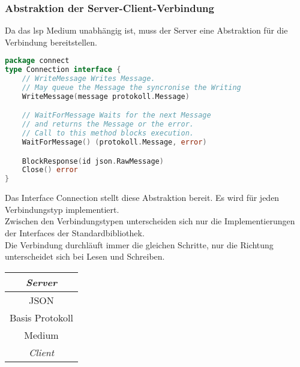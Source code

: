 \documentclass[./einleitung.tex]{subfiles}
\begin{document}
    \subsubsection{Abstraktion der Server-Client-Verbindung}
    Da das \acrshort{lsp} Medium unabhängig ist, muss der Server eine Abstraktion für die Verbindung bereitstellen.
    \begin{lstlisting}[language=Go]
package connect
type Connection interface {
	// WriteMessage Writes Message.
    // May queue the Message the syncronise the Writing
	WriteMessage(message protokoll.Message)

	// WaitForMessage Waits for the next Message
    // and returns the Message or the error.
	// Call to this method blocks execution.
	WaitForMessage() (protokoll.Message, error)

	BlockResponse(id json.RawMessage)
	Close() error
}
    \end{lstlisting}
    Das Interface Connection stellt diese Abstraktion bereit.
    Es wird für jeden Verbindungstyp implementiert.\\
    Zwischen den Verbindungstypen unterscheiden sich nur die Implementierungen der Interfaces der Standardbibliothek.\\
    Die Verbindung durchläuft immer die gleichen Schritte, nur die Richtung unterscheidet sich bei Lesen und Schreiben.
    \begin{center}
        \begin{center}
            \left\downarrow
            \left\uparrow
            \left\vspace{1cm}
            \begin{tabular}{|c|}
                \hline
                \textit{Server}\\
                \hline
                JSON\\
                \hline
                Basis Protokoll\\
                \hline
                Medium\\
                \hline
                \textit{Client}\\
                \hline
            \end{tabular}
        \end{center}
    \end{center}
\end{document}
